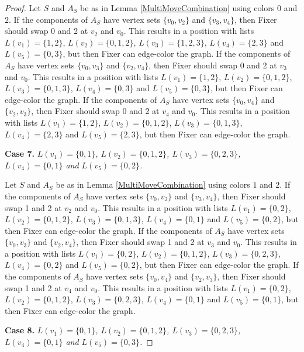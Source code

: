 \documentclass[12pt]{amsart}
\theoremstyle{plain}
\theoremstyle{definition}
\theoremstyle{remark}
\begin{document}
\begin{proof}
Let $S$ and $A_S$ be as in Lemma \ref{MultiMoveCombination} using colors $0$ and $2$. If the components of $A_S$ have vertex sets $\{v_0, v_2\}$ and $\{v_3, v_4\}$, then Fixer should swap 0 and 2 at $v_2$ and $v_0$. This results in a position with lists $L(v_1) = \{1, 2\}$, $L(v_2) = \{0, 1, 2\}$, $L(v_3) = \{1, 2, 3\}$, $L(v_4) = \{2, 3\}$ and $L(v_5) = \{0, 3\}$, but then Fixer can edge-color the graph.
If the components of $A_S$ have vertex sets $\{v_0, v_3\}$ and $\{v_2, v_4\}$, then Fixer should swap 0 and 2 at $v_3$ and $v_0$. This results in a position with lists $L(v_1) = \{1, 2\}$, $L(v_2) = \{0, 1, 2\}$, $L(v_3) = \{0, 1, 3\}$, $L(v_4) = \{0, 3\}$ and $L(v_5) = \{0, 3\}$, but then Fixer can edge-color the graph.
If the components of $A_S$ have vertex sets $\{v_0, v_4\}$ and $\{v_2, v_3\}$, then Fixer should swap 0 and 2 at $v_4$ and $v_0$. This results in a position with lists $L(v_1) = \{1, 2\}$, $L(v_2) = \{0, 1, 2\}$, $L(v_3) = \{0, 1, 3\}$, $L(v_4) = \{2, 3\}$ and $L(v_5) = \{2, 3\}$, but then Fixer can edge-color the graph.

\noindent\textbf{Case 7.  }\textit{$L(v_1) = \{0, 1\}$, $L(v_2) = \{0, 1, 2\}$, $L(v_3) = \{0, 2, 3\}$, $L(v_4) = \{0, 1\}$ and $L(v_5) = \{0, 2\}$.}

Let $S$ and $A_S$ be as in Lemma \ref{MultiMoveCombination} using colors $1$ and $2$. If the components of $A_S$ have vertex sets $\{v_0, v_2\}$ and $\{v_3, v_4\}$, then Fixer should swap 1 and 2 at $v_2$ and $v_0$. This results in a position with lists $L(v_1) = \{0, 2\}$, $L(v_2) = \{0, 1, 2\}$, $L(v_3) = \{0, 1, 3\}$, $L(v_4) = \{0, 1\}$ and $L(v_5) = \{0, 2\}$, but then Fixer can edge-color the graph.
If the components of $A_S$ have vertex sets $\{v_0, v_3\}$ and $\{v_2, v_4\}$, then Fixer should swap 1 and 2 at $v_3$ and $v_0$. This results in a position with lists $L(v_1) = \{0, 2\}$, $L(v_2) = \{0, 1, 2\}$, $L(v_3) = \{0, 2, 3\}$, $L(v_4) = \{0, 2\}$ and $L(v_5) = \{0, 2\}$, but then Fixer can edge-color the graph.
If the components of $A_S$ have vertex sets $\{v_0, v_4\}$ and $\{v_2, v_3\}$, then Fixer should swap 1 and 2 at $v_4$ and $v_0$. This results in a position with lists $L(v_1) = \{0, 2\}$, $L(v_2) = \{0, 1, 2\}$, $L(v_3) = \{0, 2, 3\}$, $L(v_4) = \{0, 1\}$ and $L(v_5) = \{0, 1\}$, but then Fixer can edge-color the graph.

\noindent\textbf{Case 8.  }\textit{$L(v_1) = \{0, 1\}$, $L(v_2) = \{0, 1, 2\}$, $L(v_3) = \{0, 2, 3\}$, $L(v_4) = \{0, 1\}$ and $L(v_5) = \{0, 3\}$.}


\end{proof}
\end{document}
